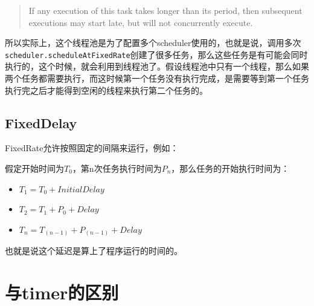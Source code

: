 \documentclass[12pt]{article}
\begin{document}
\begin{quote}
If any execution of this task takes longer than its period, then subsequent executions may start late, but will not concurrently execute.
\end{quote}

所以实际上，这个线程池是为了配置多个scheduler使用的，也就是说，调用多次\texttt{scheduler.scheduleAtFixedRate}创建了很多任务，那么这些任务是有可能会同时执行的，这个时候，就会利用到线程池了。假设线程池中只有一个线程，那么如果两个任务都需要执行，而这时候第一个任务没有执行完成，是需要等到第一个任务执行完之后才能得到空闲的线程来执行第二个任务的。

\subsection{FixedDelay}\label{fixeddelay}

FixedRate允许按照固定的间隔来运行，例如：

\begin{Shaded}
\begin{Highlighting}[]
\OperatorTok{(()} \OperatorTok{{-}\textgreater{}} \OperatorTok{\{}
            \OperatorTok{(}\OperatorTok{);}
        \OperatorTok{\},} \OperatorTok{,} \OperatorTok{,} \OperatorTok{);} 
\end{Highlighting}
\end{Shaded}

假定开始时间为\(T_0\)，第n次任务执行时间为\(P_n\)，那么任务的开始执行时间为：

\begin{itemize}
\tightlist
\item
  \(T_1 = T_0 + InitialDelay\)
\item
  \(T_2 = T_1 + P_0 + Delay\)
\item
  \(T_n = T_(n-1) + P_(n-1) + Delay\)
\end{itemize}

也就是说这个延迟是算上了程序运行的时间的。

\section{与timer的区别}\label{ux4e0etimerux7684ux533aux522b}
\end{document}
